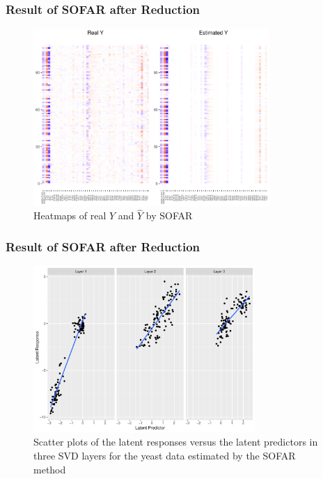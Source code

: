 \begin{frame}
    \frametitle{Result of SOFAR after Reduction}
    \begin{figure}[h]
        \centering
        \includegraphics[width=0.8\textwidth]{./figs/heatmap2.pdf}
        \caption{Heatmaps of real $Y$ and $\hat{Y}$ by SOFAR}
    \end{figure}
\end{frame}

\begin{frame}
    \frametitle{Result of SOFAR after Reduction}
    \begin{figure}[h]
        \centering
        \includegraphics[width=0.75\textwidth]{./figs/letent2.pdf}
        \caption{Scatter plots of the latent responses versus the latent predictors in three SVD layers for the yeast data estimated by the SOFAR method}
    \end{figure}
\end{frame}

